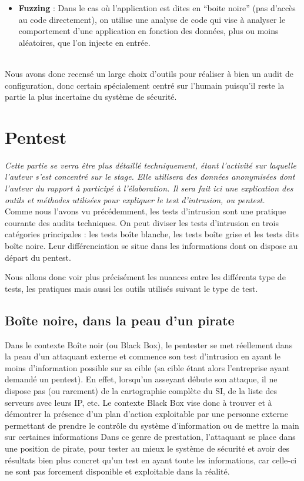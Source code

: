\documentclass[a4paper]{memoir}
\begin{document}
\begin{itemize}
\item \textbf{Fuzzing} : Dans le cas où l'application est dites en ``boite noire'' (pas d'accès au code directement), on utilise une analyse de code qui vise à analyser le comportement d'une application en fonction des données, plus ou moins aléatoires, que l'on injecte en entrée.\\\\
  
\end{itemize}

Nous avons donc recensé un large choix d'outils pour réaliser à bien un audit de configuration, donc certain spécialement centré sur l'humain puisqu'il reste la partie la plus incertaine du système de sécurité.\\
  
\chapter{Pentest}

\textit{Cette partie se verra être plus détaillé techniquement, étant l'activité sur laquelle l'auteur s'est concentré sur le stage. Elle utilisera des données anonymisées dont l'auteur du rapport à participé à l'élaboration. Il sera fait ici une explication des outils et méthodes utilisées pour expliquer le test d'intrusion, ou pentest.}\\

Comme nous l'avons vu précédemment, les tests d'intrusion sont une pratique courante des audits techniques. On peut diviser les tests d'intrusion en trois catégories principales : les tests boîte blanche, les tests boîte grise et les tests dits boîte noire. Leur différenciation se situe dans les informations dont on dispose au départ du pentest. 

Nous allons donc voir plus précisément les nuances entre les différents type de tests, les pratiques mais aussi les outils utilisés suivant le type de test.\\

\section{Boîte noire, dans la peau d'un pirate}

Dans le contexte Boîte noir (ou Black Box), le pentester se met réellement dans la peau d’un attaquant externe et commence son test d’intrusion en ayant le moins d’information possible sur sa cible (sa cible étant alors l'entreprise ayant demandé un pentest). En effet, lorsqu’un asseyant débute son attaque, il ne dispose pas (ou rarement) de la cartographie complète du SI, de la liste des serveurs avec leurs IP, etc. Le contexte Black Box vise donc à trouver et à démontrer la présence d’un plan d’action exploitable par une personne externe permettant de prendre le contrôle du système d’information ou de mettre la main sur certaines informations
Dans ce genre de prestation, l'attaquant se place dans une position de pirate, pour tester au mieux le système de sécurité et avoir des résultats bien plus concret qu'un test en ayant toute les informations, car celle-ci ne sont pas forcement disponible et exploitable dans la réalité.
\end{document}
